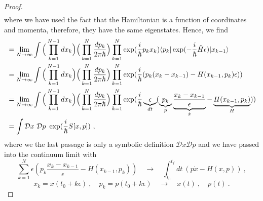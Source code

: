 \begin{proof}
\begin{equation*}
\begin{aligned}
        \end{aligned}
        \end{equation*}
        where we have used the fact that the Hamiltonian is a function of coordinates and momenta, therefore, they have the same eigenstates. Hence, we find
        \begin{equation*}
        \begin{aligned}
            & = \lim_{N \rightarrow \infty} \int \Big ( \prod_{k=1}^{N-1} dx_k \Big) \Big ( \prod_{k=1}^{N} \frac{dp_k}{2 \pi \hbar} \Big) \prod_{k=1}^{N} \exp(\frac{i}{\hbar} p_k x_k) \langle p_k\vert \exp(- \frac{i}{\hbar} \hat H \epsilon) \vert x_{k-1}\rangle \\ & = \lim_{N \rightarrow \infty} \int \Big ( \prod_{k=1}^{N-1} dx_k \Big) \Big ( \prod_{k=1}^{N} \frac{dp_k}{2 \pi \hbar} \Big) \prod_{k=1}^{N} \exp(\frac{i}{\hbar} (p_k (x_k - x_{k-1}) - H(x_{k-1}, p_k) \epsilon )) \\ & = \lim_{N \rightarrow \infty} \int \Big ( \prod_{k=1}^{N-1} dx_k \Big) \Big ( \prod_{k=1}^{N} \frac{dp_k}{2 \pi \hbar} \Big) \prod_{k=1}^{N} \exp(\frac{i}{\hbar} \underbrace{\epsilon}_{dt} (\underbrace{p_k}_p \underbrace{\frac{x_k-x_{k-1}}{\epsilon}}_{\dot x} - \underbrace{H(x_{k-1}, p_k)}_{H} )) \\ & = \int \mathcal D x ~ \mathcal D p ~ \exp(\frac{i}{\hbar} S[x,p]) ~,
        \end{aligned}
        \end{equation*}
        where we the last passage is only a symbolic definition $\mathcal D x \mathcal D p$ and we have passed into the continuum limit with  
        \begin{equation*}
            \sum_{k=1}^N \epsilon (p_k \frac{x_k - x_{k-1}}{\epsilon} - H(x_{k-1}, p_k)) \quad \rightarrow \quad \int_{t_0}^{t_f} dt ~ (p \dot x - H(x, p)) ~,
        \end{equation*}
        \begin{equation*}
            x_k = x (t_0 + k \epsilon) ~, \quad p_k = p(t_0 + k \epsilon) \quad \rightarrow \quad x(t) ~, \quad p(t) ~.
        \end{equation*}
    \end{proof}

